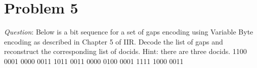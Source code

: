 \documentclass{article}
\begin{document}
\section{Problem 5}
\noindent \textit{Question}: Below is a bit sequence for a set of gaps encoding using Variable Byte encoding as described in Chapter 5 of
IIR. Decode the list of gaps and reconstruct the corresponding list of docids. Hint: there are three docids.
1100 0001 0000 0011 1011 0011 0000 0100 0001 1111 1000 0011
\end{document}
